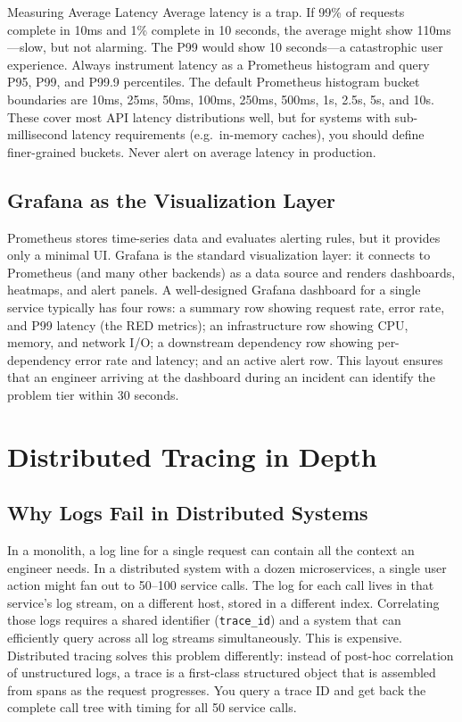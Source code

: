 \documentclass[11pt,a4paper]{article}
\begin{document}
\begin{trapbox}{Measuring Average Latency}
  Average latency is a trap. If 99\% of requests complete in 10ms and 1\% complete in 10 seconds, the average might show 110ms---slow, but not alarming. The P99 would show 10 seconds---a catastrophic user experience. Always instrument latency as a Prometheus histogram and query P95, P99, and P99.9 percentiles. The default Prometheus histogram bucket boundaries are 10ms, 25ms, 50ms, 100ms, 250ms, 500ms, 1s, 2.5s, 5s, and 10s. These cover most API latency distributions well, but for systems with sub-millisecond latency requirements (e.g.\ in-memory caches), you should define finer-grained buckets. Never alert on average latency in production.
\end{trapbox}

\subsection{Grafana as the Visualization Layer}

Prometheus stores time-series data and evaluates alerting rules, but it provides only a minimal UI. Grafana is the standard visualization layer: it connects to Prometheus (and many other backends) as a data source and renders dashboards, heatmaps, and alert panels. A well-designed Grafana dashboard for a single service typically has four rows: a summary row showing request rate, error rate, and P99 latency (the RED metrics); an infrastructure row showing CPU, memory, and network I/O; a downstream dependency row showing per-dependency error rate and latency; and an active alert row. This layout ensures that an engineer arriving at the dashboard during an incident can identify the problem tier within 30 seconds.

\section{Distributed Tracing in Depth}

\subsection{Why Logs Fail in Distributed Systems}

In a monolith, a log line for a single request can contain all the context an engineer needs. In a distributed system with a dozen microservices, a single user action might fan out to 50--100 service calls. The log for each call lives in that service's log stream, on a different host, stored in a different index. Correlating those logs requires a shared identifier (\texttt{trace\_id}) and a system that can efficiently query across all log streams simultaneously. This is expensive. Distributed tracing solves this problem differently: instead of post-hoc correlation of unstructured logs, a trace is a first-class structured object that is assembled from spans as the request progresses. You query a trace ID and get back the complete call tree with timing for all 50 service calls.
\end{document}
